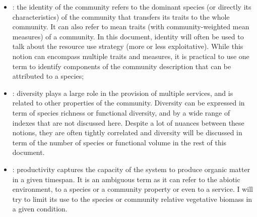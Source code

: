 \begin{itemize}
\item {}: the identity of the community refers to the dominant species (or directly its characteristics) of the community that transfers its traits to the whole community. It can also refer to mean traits (with community-weighted mean measures) of a community. In this document, identity will often be used to talk about the resource use strategy (more or less exploitative). While this notion can encompass multiple traits and measures, it is practical to use one term to identify components of the community description that can be attributed to a species;
\item {}: diversity plays a large role in the provision of multiple services, and is related to other properties of the community. Diversity can be expressed in term of species richness or functional diversity, and by a wide range of indexes that are not discussed here. Despite a lot of nuances between these notions, they are often tightly correlated and diversity will be discussed in term of the number of species or functional volume in the rest of this document.
\item {}: productivity captures the capacity of the system to produce organic matter in a given timespan. It is an ambiguous term as it can refer to the abiotic environment, to a species or a community property or even to a service. I will try to limit its use to the species or community relative vegetative biomass in a given condition.
\end{itemize}




